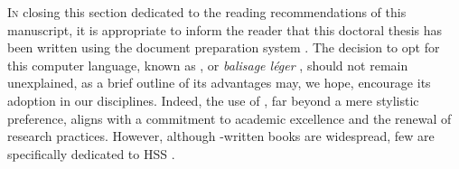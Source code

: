 \lettrine[lines=3, findent=8pt, nindent=0pt]{ I}{n} closing this section dedicated to the reading recommendations of this manuscript, it is appropriate to inform the reader that this doctoral thesis has been written using the document preparation system \latexword{\LaTeX}. The decision to opt for this computer language, known as , or \textsl{balisage léger} \textcolor{blue}{\autocite[16]{pochet_markdown_2023}}, should not remain unexplained, as a brief outline of its advantages may, we hope, encourage its adoption in our disciplines. Indeed, the use of \latexword{\LaTeX}, far beyond a mere stylistic preference, aligns with a commitment to academic excellence and the renewal of research practices. However, although \latexword{\LaTeX}-written books are widespread, few are specifically dedicated to \acrshort{HSS} \textcolor{blue}{\autocite[7]{rouquette_xelatex_2012}}.%

